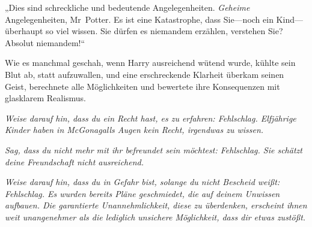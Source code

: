 „Dies sind schreckliche und bedeutende Angelegenheiten. \emph{Geheime} Angelegenheiten, Mr~Potter. Es ist eine Katastrophe, dass Sie—noch ein Kind—überhaupt so viel wissen. Sie dürfen es niemandem erzählen, verstehen Sie? Absolut niemandem!“

Wie es manchmal geschah, wenn Harry ausreichend wütend wurde, kühlte sein Blut ab, statt aufzuwallen, und eine erschreckende Klarheit überkam seinen Geist, berechnete alle Möglichkeiten und bewertete ihre Konsequenzen mit glasklarem Realismus.

\emph{Weise darauf hin, dass du ein Recht hast, es zu erfahren: Fehlschlag. Elfjährige Kinder haben in McGonagalls Augen kein Recht, irgendwas zu wissen.}

\emph{Sag, dass du nicht mehr mit ihr befreundet sein möchtest: Fehlschlag. Sie schätzt deine Freundschaft nicht ausreichend.}

\emph{Weise darauf hin, dass du in Gefahr bist, solange du nicht Bescheid weißt: Fehlschlag. Es wurden bereits Pläne geschmiedet, die auf deinem Unwissen aufbauen. Die \emph{garantierte} Unannehmlichkeit, diese zu überdenken, erscheint ihnen weit unangenehmer als die lediglich \emph{unsichere} Möglichkeit, dass dir etwas zustößt.}

